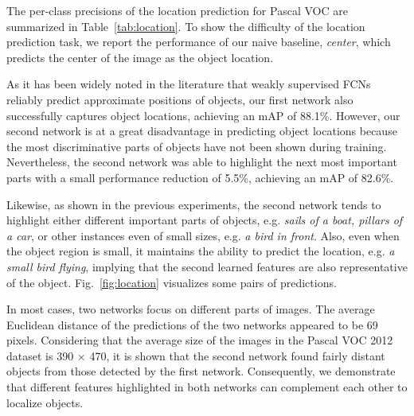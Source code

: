 \documentclass[10pt,twocolumn,letterpaper]{article}
\newcommand{\figref}[1]{Fig.~\ref{#1}}
\newcommand{\tabfref}[1]{Table~\ref{#1}}
\begin{document}
The per-class precisions of the location prediction for Pascal VOC are summarized in \tabfref{tab:location}. To show the difficulty of the location prediction task, we report the performance of our naive baseline, \textit{center}, which predicts the center of the image as the object location. 

As it has been widely noted in the literature \cite{zhou2016cvpr, Oquab15, SimonyanVZ13bg, kolesnikov2016seed} that weakly supervised FCNs reliably predict approximate positions of objects, our first network also successfully captures object locations, achieving an mAP of 88.1\%. However, our second network is at a great disadvantage in predicting object locations because the most discriminative parts of objects have not been shown during training. Nevertheless, the second network was able to highlight the next most important parts with a small performance reduction of 5.5\%, achieving an mAP of 82.6\%.  

Likewise, as shown in the previous experiments, the second network tends to highlight either different important parts of objects, e.g. \textit{sails of a boat, pillars of a car}, or other instances even of small sizes, e.g. \textit{a bird in front}. Also, even when the object region is small, it maintains the ability to predict the location, e.g. \textit{a small bird flying}, implying that the second learned features are also representative of the object. \figref{fig:location} visualizes some pairs of predictions. 

In most cases, two networks focus on different parts of images. The average Euclidean distance of the predictions of the two networks appeared to be 69 pixels. Considering that the average size of the images in the Pascal VOC 2012 dataset is 390 $\times$ 470, it is shown that the second network found fairly distant objects from those detected by the first network. Consequently, we demonstrate that different features highlighted in both networks can complement each other to localize objects.


\end{document}
